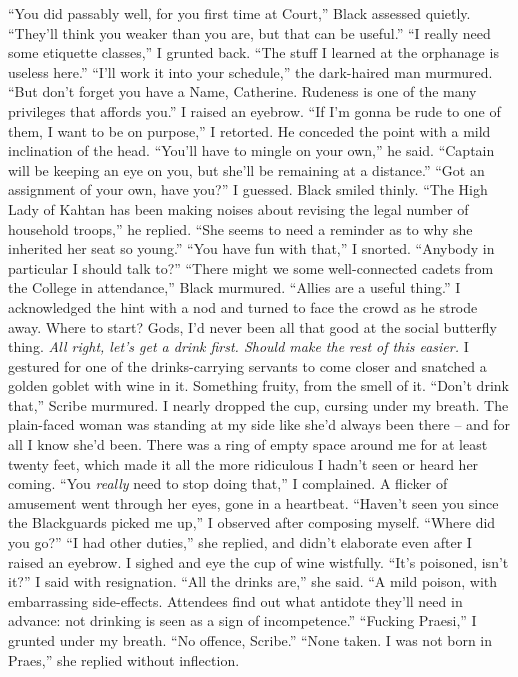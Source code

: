 \documentclass[12pt, openany]{book}
\begin{document}
“You did passably well, for you first time at Court,” Black assessed quietly. “They’ll think you weaker than you are, but that can be useful.”
“I really need some etiquette classes,” I grunted back. “The stuff I learned at the orphanage is useless here.”
“I’ll work it into your schedule,” the dark-haired man murmured. “But don’t forget you have a Name, Catherine. Rudeness is one of the many privileges that affords you.”
I raised an eyebrow. “If I’m gonna be rude to one of them, I want to be on purpose,” I retorted.
He conceded the point with a mild inclination of the head. “You’ll have to mingle on your own,” he said. “Captain will be keeping an eye on you, but she’ll be remaining at a distance.”
“Got an assignment of your own, have you?” I guessed.
Black smiled thinly.
“The High Lady of Kahtan has been making noises about revising the legal number of household troops,” he replied. “She seems to need a reminder as to why she inherited her seat so young.”
“You have fun with that,” I snorted. “Anybody in particular I should talk to?”
“There might we some well-connected cadets from the College in attendance,” Black murmured. “Allies are a useful thing.”
I acknowledged the hint with a nod and turned to face the crowd as he strode away. Where to start? Gods, I’d never been all that good at the social butterfly thing. \textit{All right, let’s get a drink first. Should make the rest of this easier.} I gestured for one of the drinks-carrying servants to come closer and snatched a golden goblet with wine in it. Something fruity, from the smell of it.
“Don’t drink that,” Scribe murmured.
I nearly dropped the cup, cursing under my breath. The plain-faced woman was standing at my side like she’d always been there – and for all I know she’d been. There was a ring of empty space around me for at least twenty feet, which made it all the more ridiculous I hadn’t seen or heard her coming.
“You \textit{really} need to stop doing that,” I complained.
A flicker of amusement went through her eyes, gone in a heartbeat.
“Haven’t seen you since the Blackguards picked me up,” I observed after composing myself. “Where did you go?”
“I had other duties,” she replied, and didn’t elaborate even after I raised an eyebrow.
I sighed and eye the cup of wine wistfully.
“It’s poisoned, isn’t it?” I said with resignation.
“All the drinks are,” she said. “A mild poison, with embarrassing side-effects. Attendees find out what antidote they’ll need in advance: not drinking is seen as a sign of incompetence.”
“Fucking Praesi,” I grunted under my breath. “No offence, Scribe.”
“None taken. I was not born in Praes,” she replied without inflection.
\end{document}
